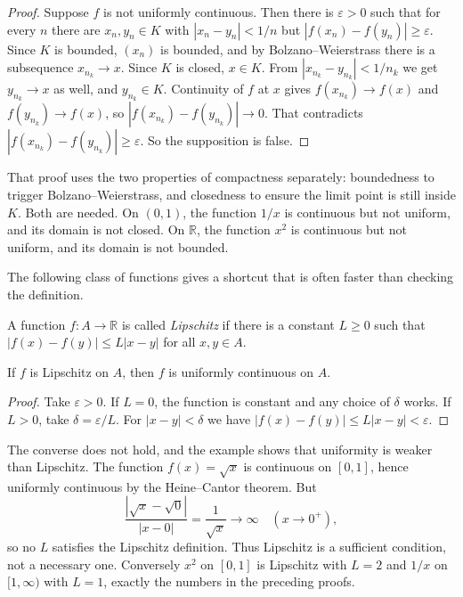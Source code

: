 \begin{proof}
Suppose $f$ is not uniformly continuous. Then there is $\varepsilon>0$ such that for every $n$
there are $x_{n},y_{n}\in K$ with $|x_{n}-y_{n}|<1/n$ but
$|f(x_{n})-f(y_{n})|\ge\varepsilon$. Since $K$ is bounded, $(x_{n})$ is bounded, and
by Bolzano--Weierstrass there is a subsequence $x_{n_{k}}\to x$. Since $K$ is closed,
$x\in K$. From $|x_{n_{k}}-y_{n_{k}}|<1/n_{k}$ we get $y_{n_{k}}\to x$ as well, and
$y_{n_{k}}\in K$. Continuity of $f$ at $x$ gives $f(x_{n_{k}})\to f(x)$ and
$f(y_{n_{k}})\to f(x)$, so $|f(x_{n_{k}})-f(y_{n_{k}})|\to 0$. That contradicts
$|f(x_{n_{k}})-f(y_{n_{k}})|\ge\varepsilon$. So the supposition is false.
\end{proof}

That proof uses the two properties of compactness separately: boundedness to trigger
Bolzano--Weierstrass, and closedness to ensure the limit point is still inside
$K$. Both are needed. On $(0,1)$, the function $1/x$ is continuous but not uniform, and
its domain is not closed. On $\mathbb{R}$, the function $x^{2}$ is continuous but not
uniform, and its domain is not bounded.

The following class of functions gives a shortcut that is often faster than checking the
definition.

\begin{definisi}[Lipschitz]
A function $f\colon A\to\mathbb{R}$ is called \emph{Lipschitz} if there is a constant $L\ge 0$
such that $|f(x)-f(y)|\le L|x-y|$ for all $x,y\in A$.
\end{definisi}

\begin{proposisi}
If $f$ is Lipschitz on $A$, then $f$ is uniformly continuous on $A$.
\end{proposisi}

\begin{proof}
Take $\varepsilon>0$. If $L=0$, the function is constant and any choice of $\delta$ works.
If $L>0$, take $\delta=\varepsilon/L$. For $|x-y|<\delta$ we have
$|f(x)-f(y)|\le L|x-y|<\varepsilon$.
\end{proof}

The converse does not hold, and the example shows that uniformity is weaker than
Lipschitz. The function $f(x)=\sqrt{x}$ is continuous on $[0,1]$, hence uniformly
continuous by the Heine--Cantor theorem. But
\[
\frac{|\sqrt{x}-\sqrt{0}|}{|x-0|}=\frac{1}{\sqrt{x}}\longrightarrow\infty
\quad (x\to 0^{+}),
\]
so no $L$ satisfies the Lipschitz definition. Thus Lipschitz is a sufficient condition,
not a necessary one. Conversely $x^{2}$ on $[0,1]$ is Lipschitz with $L=2$
and $1/x$ on $[1,\infty)$ with $L=1$, exactly the numbers in the preceding proofs.

